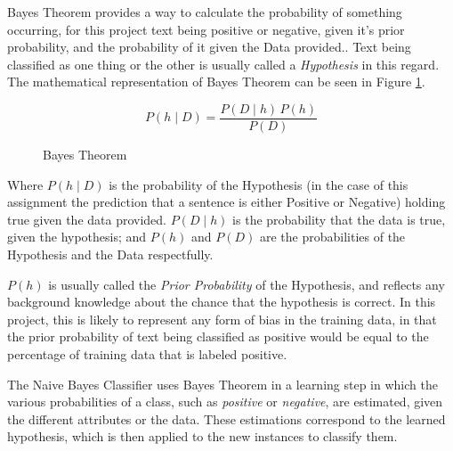 Bayes Theorem provides a way to calculate the probability of something occurring, for this project text being positive or negative, given it's prior probability, and the probability of it given the Data provided.\cite{Mitchell1997}. Text being classified as one thing or the other is usually called a \emph{Hypothesis} in this regard. The mathematical representation of Bayes Theorem can be seen in Figure \ref{fig:bayes_theorem}.
\begin{figure}[ht]
$$ P(h \mid D) = \frac{P(D \mid h) \, P(h)}{P(D)} $$
\caption{Bayes Theorem}
\label{fig:bayes_theorem}
\end{figure}

Where $P(h \mid D)$ is the probability of the Hypothesis (in the case of this assignment the prediction that a sentence is either Positive or Negative) holding true given the data provided. $P(D \mid h)$ is the probability that the data is true, given the hypothesis; and $P(h)$ and $P(D)$ are the probabilities of the Hypothesis and the Data respectfully.

$P(h)$ is usually called the \emph{Prior Probability} of the Hypothesis, and reflects any background knowledge about the chance that the hypothesis is correct. In this project, this is likely to represent any form of bias in the training data, in that the prior probability of text being classified as positive would be equal to the percentage of training data that is labeled positive.

The Naive Bayes Classifier uses Bayes Theorem in a learning step in which the various probabilities of a class, such as \emph{positive} or \emph{negative}, are estimated, given the different attributes or the data\cite{Mitchell1997}. These estimations correspond to the learned hypothesis, which is then applied to the new instances to classify them.

